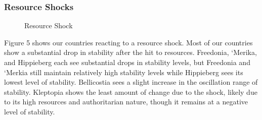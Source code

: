 \documentclass[12pt]{article}
\begin{document}
\begin{spacing}{1.5}
\subsubsection{Resource Shocks} 

\begin{figure}[htb]
\centering 
{} 
\caption{Resource Shock}
\end{figure}

Figure 5 shows our countries reacting to a resource shock. Most of our countries show a substantial drop in stability after the hit to resources. Freedonia, `Merika, and Hippieberg each see substantial drops in stability levels, but Freedonia and `Merkia still maintain relatively high stability levels while Hippieberg sees its lowest level of stability. Bellicostia sees a slight increase in the oscillation range of stability. Kleptopia shows the least amount of change due to the shock, likely due to its high resources and authoritarian nature, though it remains at a negative level of stability. 


\end{spacing}
\end{document}
